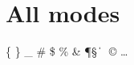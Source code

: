 \documentclass[12pt,a4paper]{article}
\begin{document}
\section*{All modes}
\{ \} \_ \# \$ \% \& \P \S \ \|
\! \, \/ \: \; \> \@
\Downarrow \Im \Leftarrow
\Leftrightarrow \Re \Rightarrow \Uparrow \Updownarrow \Vdash \aleph \angle
\approx \approxeq \asymp \beth \bigcap \bigcup \bigodot \bigoplus \bigotimes
\bigsqcup \biguplus \bigvee \bigwedge \bot \circeq \clubsuit
\complement \cong \coprod \copyright \dag \daleth \dashv \ddag \ddots
\doteq \downarrow \ell \emptyset \eqcirc \equiv \exists
\fallingdotseq \flat \forall \geq \geqslant \gg \gimel \heartsuit
\hookleftarrow \hookrightarrow \iiint \iint \in \infty \int \ldots
\leftarrow \leftharpoondown \leftharpoonup \leq \leqslant \ll \lnot
\mapsto \measuredangle \mho \models \nVDash \nVdash \nabla
\natural \ne \nearrow \neg \nequiv \nexists \ni \nmid \notin
\nparallel \nsim \nvDash \nvdash \nwarrow
\end{document}
